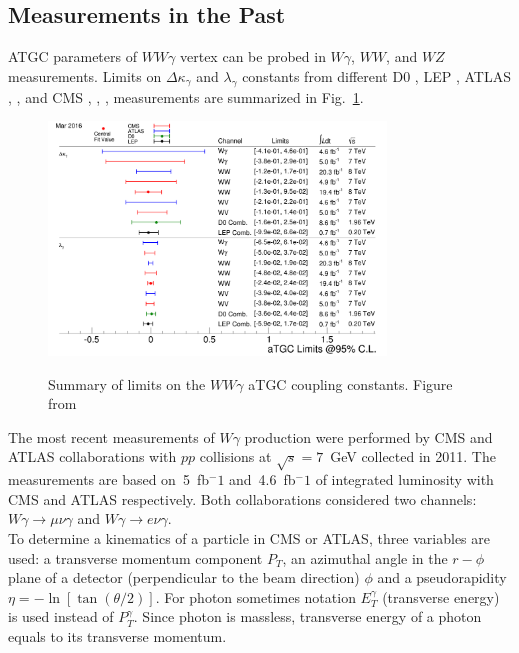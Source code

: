 \subsection{Measurements in the Past}

ATGC parameters of $WW\gamma$ vertex can be probed in $W\gamma$, $WW$, and $WZ$ measurements. Limits on $\Delta \kappa_\gamma$ and $\lambda_\gamma$ constants from different D0 \cite{ref_D0_aTGC_comb}, LEP \cite{ref_LEP_aTGC_comb}, ATLAS \cite{ref_7TeV_ATLAS}, \cite{ref_ATLAS_WW_8TeV}, \cite{ref_ATLAS_VW_8TeV} and CMS \cite{ref_7TeV_CMS}, \cite{ref_CMS_WW_7TeV}, \cite{ref_CMS_WW_8TeV}, \cite{ref_CMS_VW_7TeV} measurements are summarized in Fig.~\ref{fig:aTGC_cg}.\\ 

\begin{figure}[htb]
  \begin{center}
    {\includegraphics[width=0.80\textwidth]{../figs/WgAbout/aTGC_cg.png}}
    \caption{Summary of limits on the $WW\gamma$ aTGC coupling constants. Figure from \cite{ref_twiki_SMP_ATGC}}
    \label{fig:aTGC_cg}
  \end{center}
\end{figure}

The most recent measurements of $W\gamma$ production were performed by CMS \cite{ref_7TeV_CMS} and ATLAS \cite{ref_7TeV_ATLAS} collaborations with $pp$ collisions at $\sqrt{s}=7$~GeV collected in 2011. The measurements are based on~5~fb$^-1$ and~4.6~fb$^-1$ of integrated luminosity with CMS and ATLAS respectively. Both collaborations considered two channels: $W\gamma\rightarrow\mu\nu\gamma$ and $W\gamma\rightarrow e\nu\gamma$.\\

To determine a kinematics of a particle in CMS or ATLAS, three variables are used: a transverse momentum component $P_T$, an azimuthal angle in the $r-\phi$ plane of a detector (perpendicular to the beam direction) $\phi$ and a pseudorapidity $\eta=-\ln[\tan(\theta/2)]$. For photon sometimes notation $E_T^\gamma$ (transverse energy) is used instead of $P_T^\gamma$. Since photon is massless, transverse energy of a photon equals to its transverse momentum.\\

